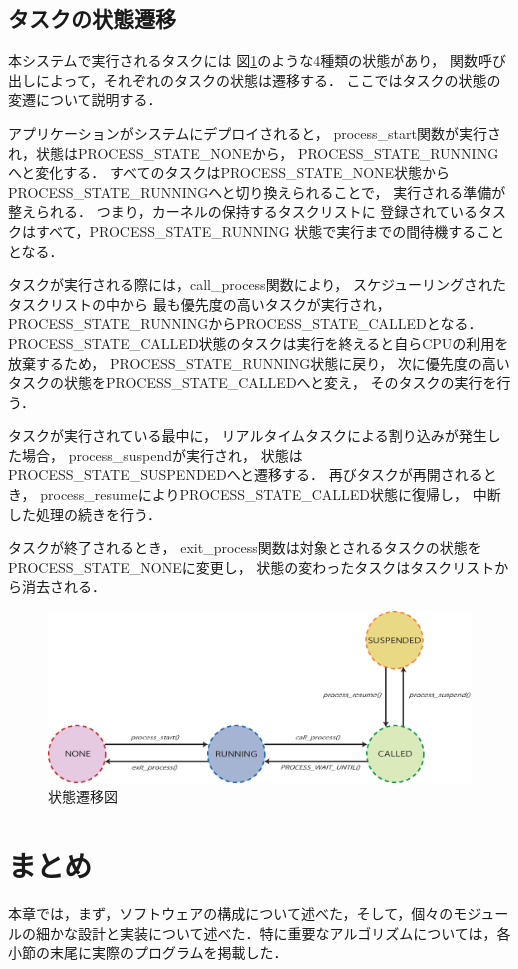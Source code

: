 \subsection{タスクの状態遷移}
本システムで実行されるタスクには
図\ref{fig:state_transition}のような4種類の状態があり，
関数呼び出しによって，それぞれのタスクの状態は遷移する．
ここではタスクの状態の変遷について説明する．

アプリケーションがシステムにデプロイされると，
process\_start関数が実行され，状態はPROCESS\_STATE\_NONEから，
PROCESS\_STATE\_RUNNINGへと変化する．
すべてのタスクはPROCESS\_STATE\_NONE状態から
PROCESS\_STATE\_RUNNINGへと切り換えられることで，
実行される準備が整えられる．
つまり，カーネルの保持するタスクリストに
登録されているタスクはすべて，PROCESS\_STATE\_RUNNING
状態で実行までの間待機することとなる．

タスクが実行される際には，call\_process関数により，
スケジューリングされたタスクリストの中から
最も優先度の高いタスクが実行され，
PROCESS\_STATE\_RUNNINGからPROCESS\_STATE\_CALLEDとなる．
PROCESS\_STATE\_CALLED状態のタスクは実行を終えると自らCPUの利用を放棄するため，
PROCESS\_STATE\_RUNNING状態に戻り，
次に優先度の高いタスクの状態をPROCESS\_STATE\_CALLEDへと変え，
そのタスクの実行を行う．

タスクが実行されている最中に，
リアルタイムタスクによる割り込みが発生した場合，
process\_suspendが実行され，
状態はPROCESS\_STATE\_SUSPENDEDへと遷移する．
再びタスクが再開されるとき，
process\_resumeによりPROCESS\_STATE\_CALLED状態に復帰し，
中断した処理の続きを行う．

タスクが終了されるとき，
exit\_process関数は対象とされるタスクの状態を
PROCESS\_STATE\_NONEに変更し，
状態の変わったタスクはタスクリストから消去される．



\begin{figure}[htbp]
 \begin{center}
  \includegraphics[width=130mm]{./images/state_transition.eps}
 \end{center}
 \caption{状態遷移図}
 \label{fig:state_transition}
\end{figure}




\section{まとめ}
本章では，まず，ソフトウェアの構成について述べた，そして，個々のモジュールの細かな設計と実装について述べた．特に重要なアルゴリズムについては，各小節の末尾に実際のプログラムを掲載した．
